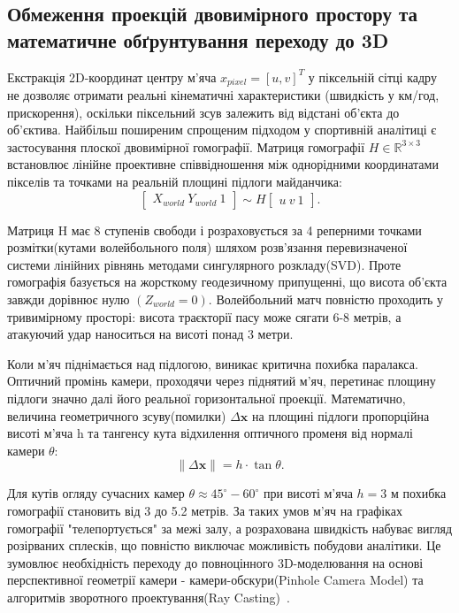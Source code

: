 \subsection{Обмеження проекцій двовимірного простору та математичне
обґрунтування переходу до 3D}

Екстракція 2D-координат центру м'яча $x_{pixel} = [u, v]^T$ у піксельній
сітці кадру не дозволяє отримати реальні кінематичні характеристики
(швидкість у км/год, прискорення), оскільки піксельний зсув залежить від
відстані об'єкта до об'єктива. Найбільш поширеним спрощеним підходом у
спортивній аналітиці є застосування плоскої двовимірної гомографії. Матриця
гомографії $H \in \mathbb{R}^{3 \times 3}$ встановлює лінійне проективне
співвідношення між однорідними координатами пікселів та точками на
реальній площині підлоги майданчика:
\begin{equation}\begin{bmatrix} X_{world} \ Y_{world} \ 1 \end{bmatrix} \sim H \begin{bmatrix} u \ v \ 1\end{bmatrix}.\end{equation}

Матриця H має 8 ступенів свободи і розраховується за 4 реперними
точками розмітки(кутами волейбольного поля) шляхом розв'язання
перевизначеної системи лінійних рівнянь методами сингулярного розкладу(SVD). Проте гомографія базується на жорсткому
геодезичному припущенні, що висота об'єкта завжди дорівнює нулю $(Z_{world} = 0)$. Волейбольний матч
повністю проходить у тривимірному просторі: висота траєкторії пасу може
сягати 6-8 метрів, а атакуючий удар наноситься на висоті понад 3 метри.

Коли м'яч піднімається над підлогою, виникає критична похибка
паралакса. Оптичний промінь камери, проходячи через піднятий м'яч,
перетинає площину підлоги значно далі його реальної горизонтальної
проекції. Математично, величина геометричного зсуву(помилки) $\Delta
\mathbf{x}$ на площині підлоги пропорційна висоті м'яча h та тангенсу кута
відхилення оптичного променя від нормалі камери $\theta$:
\begin{equation}\|\Delta \mathbf{x}\| = h \cdot \tan{\theta}. \end{equation}

Для кутів огляду сучасних камер $\theta \approx 45^{\circ}-60^{\circ}$ при
висоті м'яча $h = 3$ м похибка гомографії становить від 3 до 5.2 метрів. За
таких умов м'яч на графіках гомографії "телепортується" за межі залу, а
розрахована швидкість набуває вигляд розірваних сплесків, що повністю
виключає можливість побудови аналітики. Це зумовлює необхідність
переходу до повноцінного 3D-моделювання на основі перспективної геометрії
камери - камери-обскури(Pinhole Camera Model) та алгоритмів зворотного
проектування(Ray Casting)~\cite{hartley_zisserman}.

